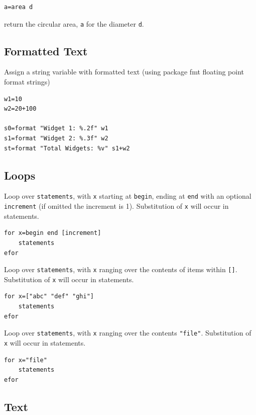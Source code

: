 \begin{verbatim}
a=area d
\end{verbatim}

return the circular area, \texttt{a} for the diameter \texttt{d}.

\hypertarget{formatted-text}{%
\subsection{Formatted Text}\label{formatted-text}}

Assign a string variable with formatted text (using package fmt floating
point format strings)

\begin{verbatim}
w1=10
w2=20+100

s0=format "Widget 1: %.2f" w1
s1=format "Widget 2: %.3f" w2
st=format "Total Widgets: %v" s1+w2
\end{verbatim}

\hypertarget{loops}{%
\subsection{Loops}\label{loops}}

Loop over \texttt{statements}, with \texttt{x} starting at
\texttt{begin}, ending at \texttt{end} with an optional
\texttt{increment} (if omitted the increment is 1). Substitution of
\texttt{x} will occur in statements.

\begin{verbatim}
for x=begin end [increment]
    statements
efor
\end{verbatim}

Loop over \texttt{statements}, with \texttt{x} ranging over the contents
of items within \texttt{{[}{]}}. Substitution of \texttt{x} will occur
in statements.

\begin{verbatim}
for x=["abc" "def" "ghi"]
    statements
efor
\end{verbatim}

Loop over \texttt{statements}, with \texttt{x} ranging over the contents
\texttt{"file"}. Substitution of \texttt{x} will occur in statements.

\begin{verbatim}
for x="file"
    statements
efor
\end{verbatim}

\hypertarget{text}{%
\subsection{Text}\label{text}}

